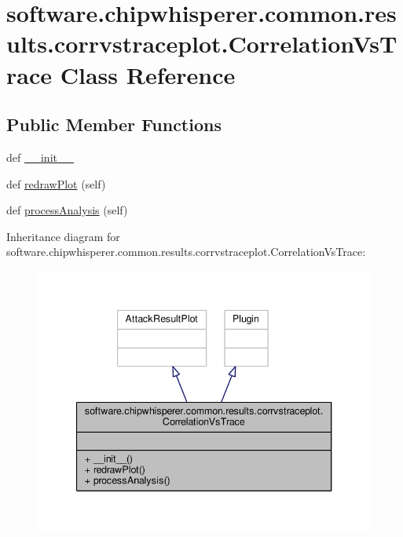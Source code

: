 \hypertarget{classsoftware_1_1chipwhisperer_1_1common_1_1results_1_1corrvstraceplot_1_1CorrelationVsTrace}{}\section{software.\+chipwhisperer.\+common.\+results.\+corrvstraceplot.\+Correlation\+Vs\+Trace Class Reference}
\label{classsoftware_1_1chipwhisperer_1_1common_1_1results_1_1corrvstraceplot_1_1CorrelationVsTrace}
\subsection*{Public Member Functions}
\begin{DoxyCompactItemize}
\item 
def \hyperlink{classsoftware_1_1chipwhisperer_1_1common_1_1results_1_1corrvstraceplot_1_1CorrelationVsTrace_a686418b8f9cb87bf46ccb4485834b913}{\+\_\+\+\_\+init\+\_\+\+\_\+}
\item 
def \hyperlink{classsoftware_1_1chipwhisperer_1_1common_1_1results_1_1corrvstraceplot_1_1CorrelationVsTrace_af204d0686ab193ad68593ff2bc18d116}{redraw\+Plot} (self)
\item 
def \hyperlink{classsoftware_1_1chipwhisperer_1_1common_1_1results_1_1corrvstraceplot_1_1CorrelationVsTrace_a7449dae0722d46992de6e981de0ef25f}{process\+Analysis} (self)
\end{DoxyCompactItemize}


Inheritance diagram for software.\+chipwhisperer.\+common.\+results.\+corrvstraceplot.\+Correlation\+Vs\+Trace\+:\nopagebreak
\begin{figure}[H]
\begin{center}
\leavevmode
\includegraphics[width=340pt]{dd/d10/classsoftware_1_1chipwhisperer_1_1common_1_1results_1_1corrvstraceplot_1_1CorrelationVsTrace__inherit__graph}
\end{center}
\end{figure}


